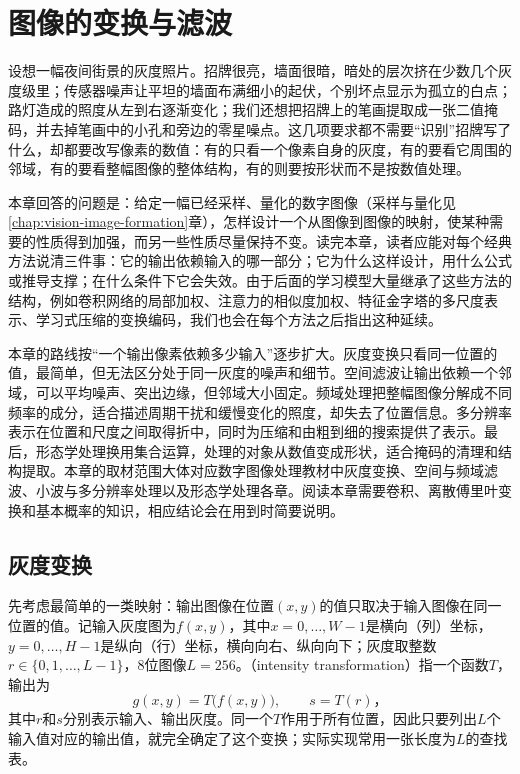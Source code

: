 \chapter{图像的变换与滤波}
\label{chap:vision-image-transforms}

设想一幅夜间街景的灰度照片。招牌很亮，墙面很暗，暗处的层次挤在少数几个灰度级里；传感器噪声让平坦的墙面布满细小的起伏，个别坏点显示为孤立的白点；路灯造成的照度从左到右逐渐变化；我们还想把招牌上的笔画提取成一张二值掩码，并去掉笔画中的小孔和旁边的零星噪点。这几项要求都不需要“识别”招牌写了什么，却都要改写像素的数值：有的只看一个像素自身的灰度，有的要看它周围的邻域，有的要看整幅图像的整体结构，有的则要按形状而不是按数值处理。

本章回答的问题是：给定一幅已经采样、量化的数字图像（采样与量化见\ref{chap:vision-image-formation}章），怎样设计一个从图像到图像的映射，使某种需要的性质得到加强，而另一些性质尽量保持不变。读完本章，读者应能对每个经典方法说清三件事：它的输出依赖输入的哪一部分；它为什么这样设计，用什么公式或推导支撑；在什么条件下它会失效。由于后面的学习模型大量继承了这些方法的结构，例如卷积网络的局部加权、注意力的相似度加权、特征金字塔的多尺度表示、学习式压缩的变换编码，我们也会在每个方法之后指出这种延续。

本章的路线按“一个输出像素依赖多少输入”逐步扩大。灰度变换只看同一位置的值，最简单，但无法区分处于同一灰度的噪声和细节。空间滤波让输出依赖一个邻域，可以平均噪声、突出边缘，但邻域大小固定。频域处理把整幅图像分解成不同频率的成分，适合描述周期干扰和缓慢变化的照度，却失去了位置信息。多分辨率表示在位置和尺度之间取得折中，同时为压缩和由粗到细的搜索提供了表示。最后，形态学处理换用集合运算，处理的对象从数值变成形状，适合掩码的清理和结构提取。本章的取材范围大体对应数字图像处理教材中灰度变换、空间与频域滤波、小波与多分辨率处理以及形态学处理各章。阅读本章需要卷积、离散傅里叶变换和基本概率的知识，相应结论会在用到时简要说明。

\section{灰度变换}
\label{sec:vision-transforms-intensity}

先考虑最简单的一类映射：输出图像在位置$(x,y)$的值只取决于输入图像在同一位置的值。记输入灰度图为$f(x,y)$，其中$x=0,\ldots,W-1$是横向（列）坐标，$y=0,\ldots,H-1$是纵向（行）坐标，横向向右、纵向向下；灰度取整数$r\in\{0,1,\ldots,L-1\}$，8位图像$L=256$。（intensity transformation）指一个函数$T$，输出为
\begin{equation}
  g(x,y)=T\bigl(f(x,y)\bigr),\qquad s=T(r)\text{，}
  \label{eq:vision-transforms-point}
\end{equation}
其中$r$和$s$分别表示输入、输出灰度。同一个$T$作用于所有位置，因此只要列出$L$个输入值对应的输出值，就完全确定了这个变换；实际实现常用一张长度为$L$的查找表。

